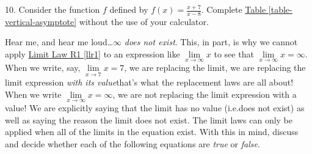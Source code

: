 \documentclass[10pt,oneside,]{book}
\theoremstyle{plain}
\theoremstyle{definition}
\numberwithin{equation}{section}
\newcommand{\hrulemedium}{\noalign{\hrule height 0.07em}}
\newcommand{\hrulethick} {\noalign{\hrule height 0.11em}}
\newcounter{figstack}
\newcounter{figindex}
\newlength\fight
\newcommand\pushValignCaptionBottom[5][b]{%
\stepcounter{figstack}%
\expandafter\def\csname %
figalign\romannumeral\value{figstack}\endcsname{#1}%
\expandafter\def\csname %
figtype\romannumeral\value{figstack}\endcsname{#2}%
\expandafter\def\csname %
figwd\romannumeral\value{figstack}\endcsname{#3}%
\expandafter\def\csname %
figcontent\romannumeral\value{figstack}\endcsname{#4}%
\expandafter\def\csname %
figcap\romannumeral\value{figstack}\endcsname{#5}%
\setbox0=\hbox{%
\begin{#2}{#3}#4\end{#2}}%
\ifdim\dimexpr\ht0+\dp0\relax>\fight\global\setlength{\fight}{%
\dimexpr\ht0+\dp0\relax}\fi%
}
\newcommand\popValignCaptionBottom{%
\setcounter{figindex}{0}%
\hfill%
\whiledo{\value{figindex}<\value{figstack}}{%
\stepcounter{figindex}%
\def\tmp{\csname figwd\romannumeral\value{figindex}\endcsname}%
\begin{\csname figtype\romannumeral\value{figindex}\endcsname}[t]{\tmp}%
\centering%
\stackinset{c}{}%
{\csname figalign\romannumeral\value{figindex}\endcsname}{}%
{\csname figcontent\romannumeral\value{figindex}\endcsname}%
{\rule{0pt}{\fight}}\par%
\csname figcap\romannumeral\value{figindex}\endcsname%
\end{\csname figtype\romannumeral\value{figindex}\endcsname}%
\hfill%
}%
\setcounter{figstack}{0}%
\setlength{\fight}{0pt}%
\hfill%
}
\newcommand{\fe}[2]{#1\mathopen{}\left(#2\right)\mathclose{}}
\begin{document}
\begin{exerciselist}
\item[10.]\hypertarget{exercise-99}{\null}Consider the function \(f\) defined by \(\fe{f}{x}=\frac{x+7}{x-8}\). Complete \hyperref[table-vertical-asymptote]{Table \ref{table-vertical-asymptote}} without the use of your calculator.%
\par\smallskip
Hear me, and hear me loud\dots{}\(\infty\) \emph{does not exist}. This, in part, is why we cannot apply \hyperref[llr1]{Limit Law R1 \ref{llr1}} to an expression like \(\lim\limits_{x\to\infty}x\) to see that \(\lim\limits_{x\to\infty}x=\infty\). When we write, say, \(\lim\limits_{x\to7}x=7\), we are replacing the limit, we are replacing the limit expression \emph{with its value}\textemdash{}that's what the replacement laws are all about! When we write \(\lim\limits_{x\to\infty}x=\infty\), we are not replacing the limit expression with a value! We are explicitly saying that the limit has no value (i.e.\@ does not exist) as well as saying the reason the limit does not exist. The limit laws can only be applied when all of the limits in the equation exist. With this in mind, discuss and decide whether each of the following equations are \emph{true} or \emph{false}.%

\end{exerciselist}
\end{document}
